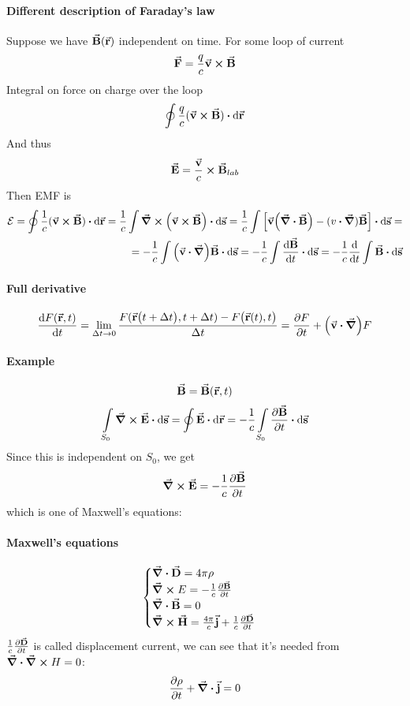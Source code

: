 \paragraph{Different description of Faraday's law}
Suppose we have $\va{B}(\va{r})$ independent on time. For some loop of current
$$\va{F} = \frac{q}{c} \va{v} \cross \va{B}$$
Integral on force on charge over the loop
$$\oint \frac{q}{c} (\va{v} \cross \va{B}) \vdot \dd{\va{r}}$$
And thus
$$\va{E} = \frac{\va{v}}{c} \cross \va{B}_{lab}$$
Then EMF is
\begin{align*}
\mathcal{E} = \oint \frac{1}{c} (\va{v} \cross \va{B}) \vdot \dd{\va{r}} = \frac{1}{c} \int \curl(\va{v} \cross \va{B}) \vdot \dd{\va{s}} = \frac{1}{c} \int \qty[\va{v}\qty(\div{\va{B}}) - (v \vdot \grad)\va{B} ] \vdot \dd{\va{s}} =\\= -\frac{1}{c} \int \qty(\va{v} \vdot \grad) \va{B} \vdot \dd{\va{s}} = -\frac{1}{c} \int \dv{\va{B}}{t} \vdot \dd{\va{s}} = -\frac{1}{c} \dv{t} \int \va{B} \vdot \dd{\va{s}}
\end{align*}
\paragraph{Full derivative}
$$\dv{F(\va{r}, t)}{t} = \lim_{\Delta t \to 0} \frac{F(\va{r}\qty\big(t+ \Delta t), t+\Delta t) - F\qty\big(\va{r}(t), t)}{\Delta t} = \pdv{F}{t} + \qty(\va{v} \vdot \grad) F$$

\paragraph{Example}
$$\va{B}= \va{B}(\va{r}, t)$$
$$\int\limits_{S_0} \curl{\va{E}} \vdot \dd{\va{s}}=\oint \va{E} \vdot \dd{\va{r}} = -\frac{1}{c} \int\limits_{S_0} \pdv{\va{B}}{t} \vdot \dd{\va{s}}$$
Since this is independent on $S_0$, we get
$$ \curl{\va{E}} = -\frac{1}{c} \pdv{\va{B}}{t}$$
which is one of Maxwell's equations:
\paragraph{Maxwell's equations}
$$\begin{cases}
\div{\va{D}} = 4\pi \rho\\
\curl{E} = -\frac{1}{c} \pdv{\va{B}}{t} \\
\div{\va{B}} = 0\\
\curl{\va{H}} = \frac{4\pi}{c} \va{j} + \frac{1}{c}\pdv{\va{D}}{t}
\end{cases}$$
$ \frac{1}{c}\pdv{\va{D}}{t}$ is called displacement current, we can see that it's needed from $\div{\curl{H}} = 0$:
$$\pdv{\rho}{t} + \div{\va{j}} = 0$$

